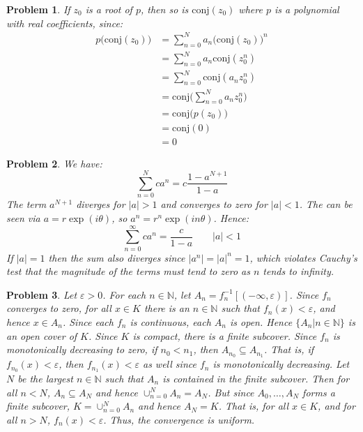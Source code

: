 \documentclass{article}
\theoremstyle{plain}
\theoremstyle{normal}
\newtheorem{problem}{Problem}[section]
\begin{document}
        \begin{problem}
            If $z_{0}$ is a root of $p$, then so is $\textrm{conj}(z_{0})$ where
            $p$ is a polynomial with \textit{real} coefficients, since:
            \begin{align}
                p\big(\textrm{conj}(z_{0})\big)
                &=\sum_{n=0}^{N}a_{n}\big(\textrm{conj}(z_{0})\big)^{n}\\
                &=\sum_{n=0}^{N}a_{n}\textrm{conj}(z_{0}^{n})\\
                &=\sum_{n=0}^{N}\textrm{conj}(a_{n}z_{0}^{n})\\
                &=\textrm{conj}\Big(\sum_{n=0}^{N}a_{n}z_{0}^{n}\Big)\\
                &=\textrm{conj}\big(p(z_{0})\big)\\
                &=\textrm{conj}(0)\\
                &=0
            \end{align}
        \end{problem}
        \begin{problem}
            We have:
            \begin{equation}
                \sum_{n=0}^{N}ca^{n}=c\frac{1-a^{N+1}}{1-a}
            \end{equation}
            The term $a^{N+1}$ diverges for $|a|>1$ and converges to zero for
            $|a|<1$. The can be seen via $a=r\exp(i\theta)$, so
            $a^{n}=r^{n}\exp(in\theta)$. Hence:
            \begin{equation}
                \sum_{n=0}^{\infty}ca^{n}=\frac{c}{1-a}\quad\quad|a|<1
            \end{equation}
            If $|a|=1$ then the sum also diverges since $|a^{n}|=|a|^{n}=1$,
            which violates Cauchy's test that the magnitude of the terms must
            tend to zero as $n$ tends to infinity.
        \end{problem}
        \begin{problem}
            Let $\varepsilon>0$. For each $n\in\mathbb{N}$, let
            $A_{n}=f_{n}^{-1}[(-\infty,\varepsilon)]$. Since
            $f_{n}$ converges to zero, for all $x\in{K}$ there is an
            $n\in\mathbb{N}$ such that $f_{n}(x)<\varepsilon$, and hence
            $x\in{A}_{n}$. Since each $f_{n}$ is continuous, each $A_{n}$ is
            open. Hence $\{A_{n}|n\in\mathbb{N}\}$ is an open cover of $K$.
            Since $K$ is compact, there is a finite subcover. Since $f_{n}$ is
            monotonically decreasing to zero, if $n_{0}<n_{1}$, then
            $A_{n_{0}}\subseteq{A}_{n_{1}}$. That is, if
            $f_{n_{0}}(x)<\varepsilon$, then $f_{n_{1}}(x)<\varepsilon$ as
            well since $f_{n}$ is monotonically decreasing. Let $N$ be the
            largest $n\in\mathbb{N}$ such that $A_{n}$ is contained in the
            finite subcover. Then for all $n<N$, $A_{n}\subseteq{A_{N}}$ and
            hence $\cup_{n=0}^{N}A_{n}=A_{N}$. But since $A_{0},\dots,A_{N}$
            forms a finite subcover, $K=\cup_{n=0}^{N}A_{n}$ and hence
            $A_{N}=K$. That is, for all $x\in{K}$, and for all $n>N$,
            $f_{n}(x)<\varepsilon$. Thus, the convergence is uniform.
        \end{problem}
\end{document}
